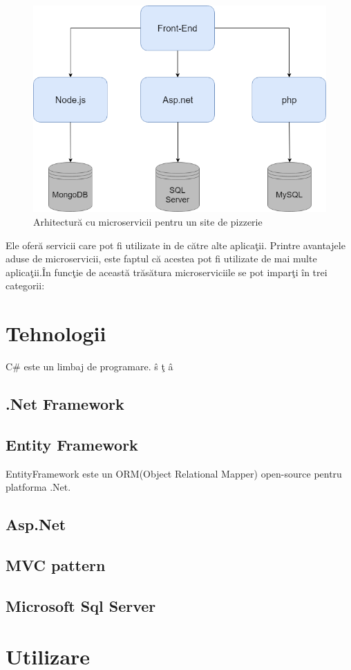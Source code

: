 \documentclass[a4paper,12pt]{report}
\begin{document}
\begin{figure}[!htb]
              \includegraphics[width=\textwidth,keepaspectratio]{PizzaMicroservicii}
              \caption{Arhitectur\u a cu microservicii pentru un site de pizzerie}
              \label{fig:PizzaMicroservicii}
\end{figure}
Ele ofer\u a servicii care pot fi utilizate in de c\u atre alte aplica\c tii.
Printre avantajele aduse de microservicii, este faptul c\u a acestea pot fi utilizate de
mai multe aplica\c tii.\^In func\c tie de aceast\u a tr\u as\u atura microserviciile se pot impar\c ti \^in
trei categorii:





\chapter{Tehnologii}

C\# este un limbaj de programare. \^ s \c t \^a

\section{.Net Framework}
\section{Entity Framework}
EntityFramework este un ORM(Object Relational Mapper) open-source pentru platforma .Net.
\section{Asp.Net}
\section{MVC pattern}
\section{Microsoft Sql Server}

\chapter{Utilizare}
\end{document}
